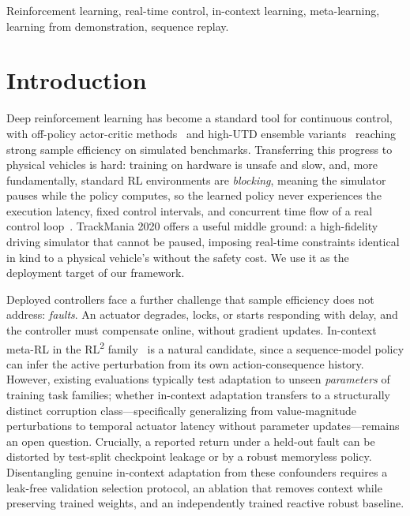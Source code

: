\documentclass[conference]{IEEEtran}
\newcommand{\rltwo}{\texorpdfstring{RL\textsuperscript{2}}{RL2}}
\begin{document}
\begin{IEEEkeywords}
Reinforcement learning, real-time control, in-context learning, meta-learning, learning from demonstration, sequence replay.
\end{IEEEkeywords}

\section{Introduction}
\label{sec:introduction}

Deep reinforcement learning has become a standard tool for continuous control, with off-policy actor-critic methods~\cite{ddpg,td3,sac} and high-UTD ensemble variants~\cite{redq,droq,crossq} reaching strong sample efficiency on simulated benchmarks. Transferring this progress to physical vehicles is hard: training on hardware is unsafe and slow, and, more fundamentally, standard RL environments are \emph{blocking}, meaning the simulator pauses while the policy computes, so the learned policy never experiences the execution latency, fixed control intervals, and concurrent time flow of a real control loop~\cite{rtrl,delayedmdp}. TrackMania 2020 offers a useful middle ground: a high-fidelity driving simulator that cannot be paused, imposing real-time constraints identical in kind to a physical vehicle's without the safety cost. We use it as the deployment target of our framework.

Deployed controllers face a further challenge that sample efficiency does not address: \emph{faults}. An actuator degrades, locks, or starts responding with delay, and the controller must compensate online, without gradient updates. In-context meta-RL in the \rltwo{} family~\cite{rl2,wang2016learning,amago} is a natural candidate, since a sequence-model policy can infer the active perturbation from its own action-consequence history. However, existing evaluations typically test adaptation to unseen \emph{parameters} of training task families; whether in-context adaptation transfers to a structurally distinct corruption class---specifically generalizing from value-magnitude perturbations to temporal actuator latency without parameter updates---remains an open question. Crucially, a reported return under a held-out fault can be distorted by test-split checkpoint leakage or by a robust memoryless policy. Disentangling genuine in-context adaptation from these confounders requires a leak-free validation selection protocol, an ablation that removes context while preserving trained weights, and an independently trained reactive robust baseline.
\end{document}
